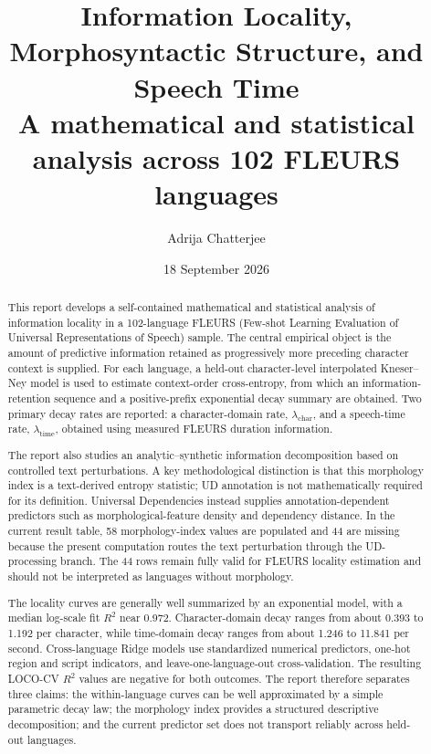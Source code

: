 \documentclass[11pt]{article}
\title{\vspace{-1em}\textbf{Information Locality, Morphosyntactic Structure, and Speech Time}\\[0.4em]
\large A mathematical and statistical analysis across 102 FLEURS languages}
\author{Adrija Chatterjee}
\date{18 September 2026}
\newcommand{\lch}{\lambda_{\mathrm{char}}}
\newcommand{\ltm}{\lambda_{\mathrm{time}}}
\begin{document}
\maketitle
\thispagestyle{empty}

\begin{abstract}
This report develops a self-contained mathematical and statistical analysis of information locality in a 102-language FLEURS (Few-shot Learning Evaluation of Universal Representations of Speech) sample. The central empirical object is the amount of predictive information retained as progressively more preceding character context is supplied. For each language, a held-out character-level interpolated Kneser--Ney model is used to estimate context-order cross-entropy, from which an information-retention sequence and a positive-prefix exponential decay summary are obtained. Two primary decay rates are reported: a character-domain rate, $\lch$, and a speech-time rate, $\ltm$, obtained using measured FLEURS duration information.

The report also studies an analytic--synthetic information decomposition based on controlled text perturbations. A key methodological distinction is that this morphology index is a text-derived entropy statistic; UD annotation is not mathematically required for its definition. Universal Dependencies instead supplies annotation-dependent predictors such as morphological-feature density and dependency distance. In the current result table, 58 morphology-index values are populated and 44 are missing because the present computation routes the text perturbation through the UD-processing branch. The 44 rows remain fully valid for FLEURS locality estimation and should not be interpreted as languages without morphology.

The locality curves are generally well summarized by an exponential model, with a median log-scale fit $R^2$ near 0.972. Character-domain decay ranges from about 0.393 to 1.192 per character, while time-domain decay ranges from about 1.246 to 11.841 per second. Cross-language Ridge models use standardized numerical predictors, one-hot region and script indicators, and leave-one-language-out cross-validation. The resulting LOCO-CV $R^2$ values are negative for both outcomes. The report therefore separates three claims: the within-language curves can be well approximated by a simple parametric decay law; the morphology index provides a structured descriptive decomposition; and the current predictor set does not transport reliably across held-out languages.
\end{abstract}
\end{document}
